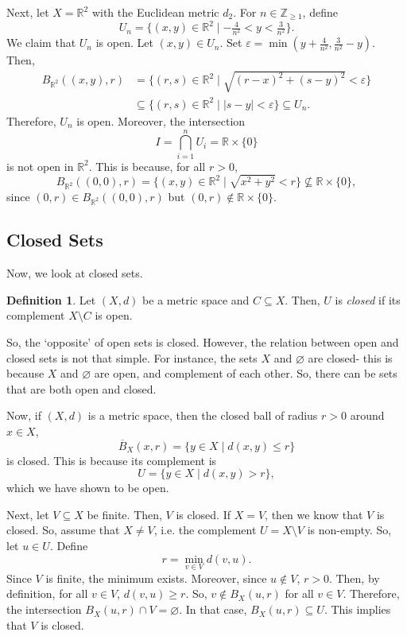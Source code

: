 \documentclass[a4paper, openany]{memoir}
\theoremstyle{definition}
\newtheorem{definition}{Definition}[section]
\theoremstyle{plain}
\begin{document}
Next, let $X = \mathbb{R}^2$ with the Euclidean metric $d_2$. For $n \in \mathbb{Z}_{\geqslant 1}$, define
\[U_n = \{(x, y) \in \mathbb{R}^2 \mid -\tfrac{4}{n^2} < y < \tfrac{3}{n^2}\}.\]
We claim that $U_n$ is open. Let $(x, y) \in U_n$. Set $\varepsilon = \min(y + \frac{4}{n^2}, \frac{3}{n^2} - y)$. Then, 
\begin{align*}
    B_{\mathbb{R}^2}((x, y), r) &= \{(r, s) \in \mathbb{R}^2 \mid \sqrt{(r-x)^2 + (s-y)^2} < \varepsilon\} \\
    &\subseteq \{(r, s) \in \mathbb{R}^2 \mid |s-y| < \varepsilon\} \subseteq U_n.
\end{align*}
\noindent Therefore, $U_n$ is open. Moreover, the intersection
\[I = \bigcap_{i=1}^n U_i = \mathbb{R} \times \{0\}\]
is not open in $\mathbb{R}^2$. This is because, for all $r > 0$, 
\[B_{\mathbb{R}^2}((0, 0), r) = \{(x, y) \in \mathbb{R}^2 \mid \sqrt{x^2 + y^2} < r\} \not\subseteq \mathbb{R} \times \{0\},\]
since $(0,r) \in B_{\mathbb{R}^2}((0, 0), r)$ but $(0, r) \not\in \mathbb{R} \times \{0\}$.

\subsection{Closed Sets}
Now, we look at closed sets.
\begin{definition}
Let $(X, d)$ be a metric space and $C \subseteq X$. Then, $U$ is \emph{closed} if its complement $X \setminus C$ is open.
\end{definition}
\noindent So, the `opposite' of open sets is closed. However, the relation between open and closed sets is not that simple. For instance, the sets $X$ and $\varnothing$ are closed- this is because $X$ and $\varnothing$ are open, and complement of each other. So, there can be sets that are both open and closed.

Now, if $(X, d)$ is a metric space, then the closed ball of radius $r > 0$ around $x \in X$,
\[\overline{B}_X(x, r) = \{y \in X \mid d(x, y) \leqslant r\}\]
is closed. This is because its complement is
\[U = \{y \in X \mid d(x, y) > r\},\]
which we have shown to be open. 

Next, let $V \subseteq X$ be finite. Then, $V$ is closed. If $X = V$, then we know that $V$ is closed. So, assume that $X \neq V$, i.e. the complement $U = X \setminus V$ is non-empty. So, let $u \in U$. Define
\[r = \min_{v \in V} d(v, u).\]
Since $V$ is finite, the minimum exists. Moreover, since $u \not\in V$, $r > 0$. Then, by definition, for all $v \in V$, $d(v, u) \geqslant r$. So, $v \not\in B_X(u, r)$ for all $v \in V$. Therefore, the intersection $B_X(u, r) \cap V = \varnothing$. In that case, $B_X(u, r) \subseteq U$. This implies that $V$ is closed.
\end{document}
